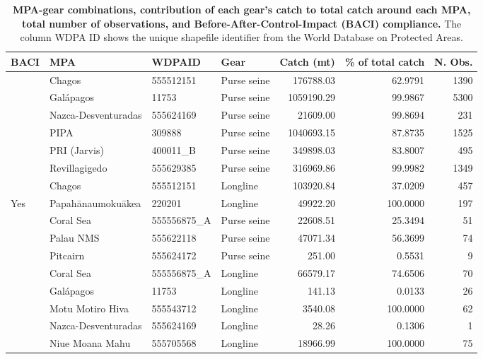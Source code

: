 \begin{table}

\caption{\label{tab:relevant_mpa_gear_combinations}\label{tab:relevant_mpa_gear_combinations}\textbf{MPA-gear combinations, contribution of each gear's catch to total catch around each MPA, total number of observations, and Before-After-Control-Impact (BACI) compliance.} The column WDPA ID shows the unique shapefile identifier from the World Database on Protected Areas.}
\centering
\begin{tabular}[t]{llllrrr}
\toprule
BACI & MPA & WDPAID & Gear & Catch (mt) & \% of total catch & N. Obs.\\
\midrule
 & Chagos & 555512151 & Purse seine & 176788.03 & 62.9791 & 1390\\
\cmidrule{2-7}
 & Galápagos & 11753 & Purse seine & 1059190.29 & 99.9867 & 5300\\
\cmidrule{2-7}
 & Nazca-Desventuradas & 555624169 & Purse seine & 21609.00 & 99.8694 & 231\\
\cmidrule{2-7}
 & PIPA & 309888 & Purse seine & 1040693.15 & 87.8735 & 1525\\
\cmidrule{2-7}
 & PRI (Jarvis) & 400011\_B & Purse seine & 349898.03 & 83.8007 & 495\\
\cmidrule{2-7}
 & Revillagigedo & 555629385 & Purse seine & 316969.86 & 99.9982 & 1349\\
\cmidrule{2-7}
 & Chagos & 555512151 & Longline & 103920.84 & 37.0209 & 457\\
\cmidrule{2-7}
\multirow{-8}{*}{\raggedright\arraybackslash Yes} & Papahānaumokuākea & 220201 & Longline & 49922.20 & 100.0000 & 197\\
\cmidrule{1-7}
 & Coral Sea & 555556875\_A & Purse seine & 22608.51 & 25.3494 & 51\\
\cmidrule{2-7}
 & Palau NMS & 555622118 & Purse seine & 47071.34 & 56.3699 & 74\\
\cmidrule{2-7}
 & Pitcairn & 555624172 & Purse seine & 251.00 & 0.5531 & 9\\
\cmidrule{2-7}
 & Coral Sea & 555556875\_A & Longline & 66579.17 & 74.6506 & 70\\
\cmidrule{2-7}
 & Galápagos & 11753 & Longline & 141.13 & 0.0133 & 26\\
\cmidrule{2-7}
 & Motu Motiro Hiva & 555543712 & Longline & 3540.08 & 100.0000 & 62\\
\cmidrule{2-7}
 & Nazca-Desventuradas & 555624169 & Longline & 28.26 & 0.1306 & 1\\
\cmidrule{2-7}
 & Niue Moana Mahu & 555705568 & Longline & 18966.99 & 100.0000 & 75\\

\end{tabular}
\end{table}

